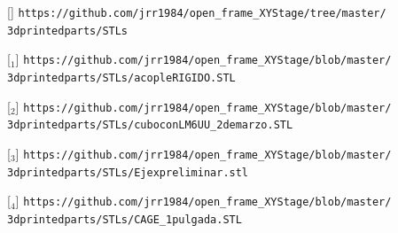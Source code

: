 [\href{https://github.com/jrr1984/open\_frame\_XYStage/tree/master/3dprintedparts/STLs}{\faCubes}] \texttt{https://github.com/jrr1984/open\_frame\_XYStage/tree/master/\\\hspace{1.5cm}3dprintedparts/STLs}

[\href{https://github.com/jrr1984/open\_frame\_XYStage/blob/master/3dprintedparts/STLs/acopleRIGIDO.STL}{\faCubes$_{1}$}] \texttt{https://github.com/jrr1984/open\_frame\_XYStage/blob/master/\\\hspace{1.5cm}3dprintedparts/STLs/acopleRIGIDO.STL}

[\href{https://github.com/jrr1984/open\_frame\_XYStage/blob/master/3dprintedparts/STLs/cuboconLM6UU\_2demarzo.STL}{\faCubes$_{2}$}] \texttt{https://github.com/jrr1984/open\_frame\_XYStage/blob/master/\\\hspace{1.5cm}3dprintedparts/STLs/cuboconLM6UU\_2demarzo.STL}

[\href{https://github.com/jrr1984/open\_frame\_XYStage/blob/master/3dprintedparts/STLs/Ejexpreliminar.stl}{\faCubes$_{3}$}] \texttt{https://github.com/jrr1984/open\_frame\_XYStage/blob/master/\\\hspace{1.5cm}3dprintedparts/STLs/Ejexpreliminar.stl}

[\href{https://github.com/jrr1984/open\_frame\_XYStage/blob/master/3dprintedparts/STLs/CAGE\_1pulgada.STL}{\faCubes$_{4}$}] \texttt{https://github.com/jrr1984/open\_frame\_XYStage/blob/master/\\\hspace{1.5cm}3dprintedparts/STLs/CAGE\_1pulgada.STL}